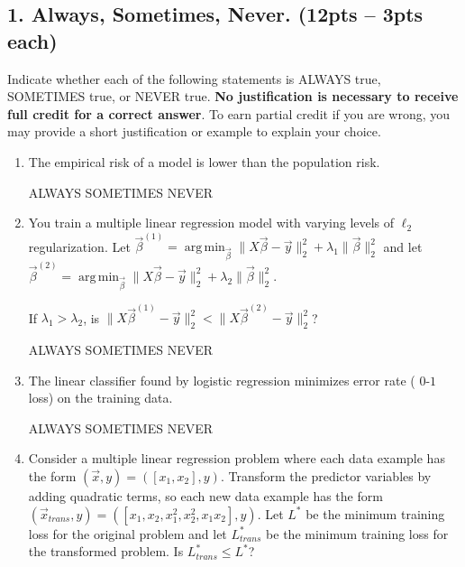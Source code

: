 \documentclass[10pt]{article}
\DeclareMathOperator*{\argmin}{arg\,min}
\begin{document}
\subsection{1. Always, Sometimes, Never. (\textbf{\small 12pts -- 3pts each})} 
Indicate whether each of the following statements is ALWAYS true, SOMETIMES true, or NEVER true. \textbf{No justification is necessary to receive full credit for a correct answer}. To earn partial credit if you are wrong, you may provide a short justification or example to explain your choice.
\begin{enumerate}[label=(\alph*)]
	\item The empirical risk of a model is lower than the population risk.
	
	ALWAYS\hspace{1em} SOMETIMES\hspace{1em} NEVER\vspace{4.5em}
	
	\item You train a multiple linear regression model with varying levels of $\ell_2$ regularization. Let $\vec{\beta}^{(1)} = \argmin_{\vec{\beta}}  \|X\vec{\beta} - \vec{y}\|_2^2 + \lambda_1 \|\vec{\beta}\|_2^2$ and let $\vec{\beta}^{(2)} = \argmin_{\vec{\beta}}  \|X\vec{\beta} - \vec{y}\|_2^2 + \lambda_2 \|\vec{\beta}\|_2^2$. 
	
	If $\lambda_1 > \lambda_2$, is $\|X\vec{\beta}^{(1)}  - \vec{y}\|_2^2 < \|X\vec{\beta}^{(2)}  - \vec{y}\|_2^2$?

	ALWAYS\hspace{1em} SOMETIMES\hspace{1em} NEVER\vspace{4.5em}
	
	\item The linear classifier found by logistic regression minimizes error rate ( $0$-$1$ loss)  on the training data. 
	
	ALWAYS\hspace{1em} SOMETIMES\hspace{1em} NEVER\vspace{4.5em}
	
%	
	
	\item Consider a multiple linear regression problem where each data example has the form $(\vec{x},y) = ([x_1,x_2],y)$. Transform the predictor variables by adding quadratic terms, so each new data example has the form $(\vec{x}_{trans},y)= ([x_1,x_2,x_1^2, x_2^2, x_1x_2],y)$. Let $L^*$ be the minimum training loss for the original problem and let ${L}_{trans}^*$ be the minimum training loss for the transformed problem. Is ${L}_{trans}^* \leq L^*$?
	

\end{enumerate}
\end{document}
